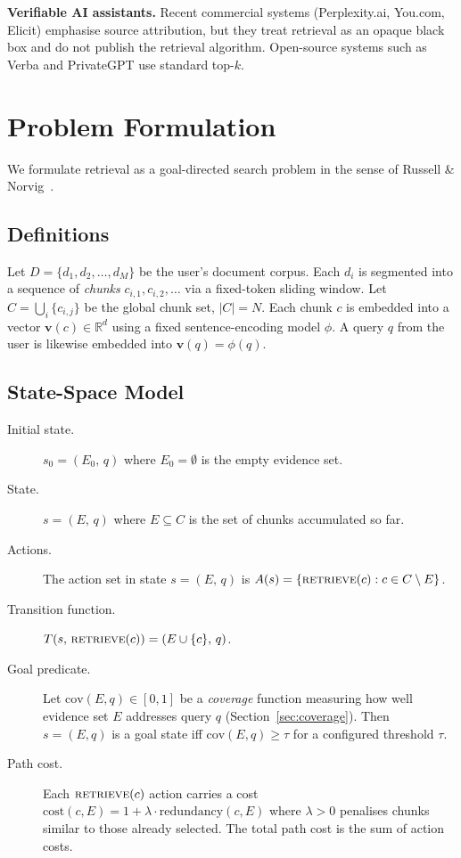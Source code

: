 \documentclass[conference]{IEEEtran}
\begin{document}
\textbf{Verifiable AI assistants.}
Recent commercial systems (Perplexity.ai, You.com, Elicit) emphasise source
attribution, but they treat retrieval as an opaque black box and do not
publish the retrieval algorithm. Open-source systems such as Verba and
PrivateGPT use standard top-$k$.

\section{Problem Formulation}
\label{sec:problem}

We formulate retrieval as a goal-directed search problem in the sense of
Russell \& Norvig~\cite{russell2020aima}.

\subsection{Definitions}

Let $D = \{d_1, d_2, \ldots, d_M\}$ be the user's document corpus. Each
$d_i$ is segmented into a sequence of \textit{chunks}
$c_{i,1}, c_{i,2}, \ldots$ via a fixed-token sliding window. Let
$C = \bigcup_i \{c_{i,j}\}$ be the global chunk set, $|C| = N$. Each chunk
$c$ is embedded into a vector $\mathbf{v}(c) \in \mathbb{R}^d$ using a fixed
sentence-encoding model $\phi$. A query $q$ from the user is likewise
embedded into $\mathbf{v}(q) = \phi(q)$.

\subsection{State-Space Model}

\begin{description}
  \item[Initial state.] $s_0 = (E_0,\,q)$ where $E_0 = \emptyset$ is the
    empty evidence set.
  \item[State.] $s = (E,\,q)$ where $E \subseteq C$ is the set of chunks
    accumulated so far.
  \item[Actions.] The action set in state $s = (E,\,q)$ is
    $A(s) = \{\textsc{retrieve}(c) : c \in C \setminus E\}$.
  \item[Transition function.]
    $T(s,\,\textsc{retrieve}(c)) = (E \cup \{c\},\,q)$.
  \item[Goal predicate.] Let $\mathrm{cov}(E,q) \in [0,1]$ be a
    \textit{coverage} function measuring how well evidence set $E$ addresses
    query $q$ (Section~\ref{sec:coverage}). Then $s = (E,q)$ is a goal
    state iff $\mathrm{cov}(E,q) \ge \tau$ for a configured threshold
    $\tau$.
  \item[Path cost.] Each $\textsc{retrieve}(c)$ action carries a cost
    $\mathrm{cost}(c,E) = 1 + \lambda \cdot \mathrm{redundancy}(c,E)$
    where $\lambda > 0$ penalises chunks similar to those already selected.
    The total path cost is the sum of action costs.
\end{description}
\end{document}
